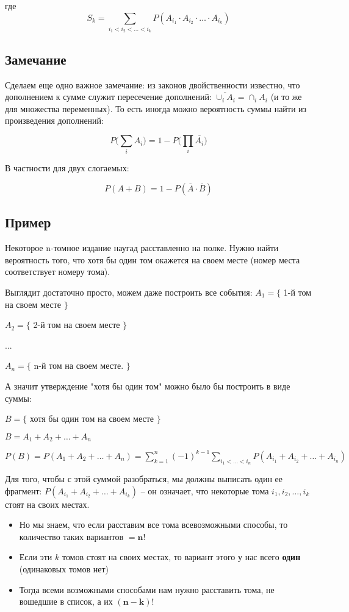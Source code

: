 \documentclass{article}
\begin{document}
где $$ S_k = \sum\limits_{i_1 < i_2 < \ldots < i_k} P(A_{i_1} \cdot A_{i_2} \cdot \ldots \cdot A_{i_k}) $$

\subsection {Замечание}
Сделаем еще одно важное замечание: из законов двойственности известно, что дополнением к сумме служит пересечение дополнений: $\overline{\cup_i A_i} = \cap_i A_i $ (и то же для множества переменных). То есть иногда можно вероятность суммы найти из произведения дополнений:

$$ P\Biggl(\sum\limits_i A_i\Biggr) = 1 - P\Biggl(\prod\limits_i \overline{A_i}\Biggr) $$

В частности для двух слогаемых:

$$P(A + B) = 1 - P(\overline{A} \cdot \overline{B}) $$

\subsection{Пример}

Некоторое n-томное издание наугад расставленно на полке. Нужно найти вероятность того, что хотя бы один том окажется на своем месте (номер места соответствует номеру тома).

\quad
Выглядит достаточно просто, можем даже построить все события:
$A_1 = \{$ 1-й том на своем месте $\}$

$A_2 = \{$ 2-й том на своем месте $\}$

...

$A_n = \{$ n-й том на своем месте. $\}$

\quad

А значит утверждение "хотя бы один том" можно было бы построить в виде суммы:

$B = \{$ хотя бы один том на своем месте $\}$

$B = A_1 + A_2 + \ldots + A_n$

$P(B) = P(A_1 + A_2 + \ldots + A_n) = \sum\limits_{k = 1}^n (-1)^{k - 1} \sum\limits_{i_1 < \ldots < i_n} P(A_{i_1} + A_{i_2} + \ldots + A_{i_n})$

\quad

Для того, чтобы с этой суммой разобраться, мы должны выписать один ее фрагмент: \newline$P(A_{i_1} + A_{i_2} + \ldots + A_{i_k})$ -- он означает, что некоторые тома $i_1, i_2, \ldots, i_k$  стоят на своих местах.

\begin{itemize}

\item Но мы знаем, что если расставим все тома всевозможными способы, то количество таких вариантов $\boldsymbol{= n!}$

\item Если эти $k$ томов стоят на своих местах, то вариант этого у нас всего \textbf{один} (одинаковых томов нет)

\item Тогда всеми возможными способами нам нужно расставить тома, не вошедшие в список, а их $\boldsymbol{(n - k)}!$
\end{itemize}
\end{document}
